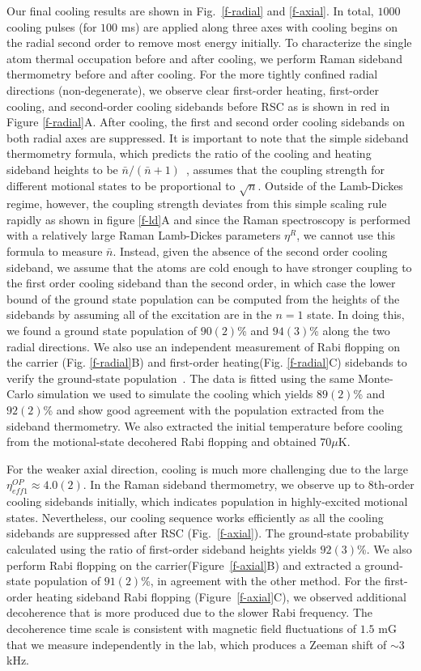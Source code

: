\documentclass[aps,prl,twocolumn,groupedaddress]{revtex4-1}
\begin{document}
Our final cooling results are shown in Fig.~\ref{f-radial} and \ref{f-axial}.
In total, $1000$ cooling pulses (for $100$ ms) are applied along three axes with
cooling begins on the radial second order to remove most energy initially.
To characterize the single atom thermal occupation before and after cooling,
we perform Raman sideband thermometry before and after cooling.
For the more tightly confined radial directions (non-degenerate),
we observe clear first-order heating, first-order cooling,
and second-order cooling sidebands before RSC as is shown in red in Figure \ref{f-radial}A.
After cooling, the first and second order cooling sidebands on both radial axes are suppressed.
It is important to note that the simple sideband thermometry formula,
which predicts the ratio of the cooling and heating sideband heights
to be $\bar n / (\bar n + 1)$~\cite{Monroe1995},
assumes that the coupling strength for different motional states to be proportional to $\sqrt{n}$.
Outside of the Lamb-Dickes regime, however,
the coupling strength deviates from this simple scaling rule rapidly
as shown in figure \ref{f-ld}A and since the Raman spectroscopy is performed
with a relatively large Raman Lamb-Dickes parameters $\eta^R$, we cannot use this formula to
measure $\bar n$.
Instead, given the absence of the second order cooling sideband,
we assume that the atoms are cold enough to have stronger coupling to the first order cooling
sideband than the second order, in which case the lower bound of the ground state population
can be computed from the heights of the sidebands by assuming all of the excitation are in the
$n=1$ state. In doing this, we found a ground state population of $90(2)$\%
and $94(3)$\% along the two radial directions.
We also use an independent measurement of Rabi flopping on the carrier (Fig. \ref{f-radial}B)
and first-order heating(Fig. \ref{f-radial}C) sidebands
to verify the ground-state population~\cite{Meekhof1996}.
The data is fitted using the same Monte-Carlo simulation we used to simulate the cooling
which yields $89(2)$\% and $92(2)$\% and show good agreement with
the population extracted from the sideband thermometry.
We also extracted the initial temperature before cooling
from the motional-state decohered Rabi flopping and obtained $70 \mu$K.

For the weaker axial direction, cooling is much more challenging
due to the large $\eta^{OP}_{eff1}\approx 4.0(2)$.
In the Raman sideband thermometry, we observe up to 8th-order cooling sidebands initially,
which indicates population in highly-excited motional states.
Nevertheless, our cooling sequence works efficiently as all the cooling sidebands are suppressed
after RSC (Fig.~\ref{f-axial}).
The ground-state probability calculated using the ratio of first-order sideband heights yields
$92(3)$\%. We also perform Rabi flopping on the carrier(Figure~\ref{f-axial}B)
and extracted a ground-state population of $91(2)$\%, in agreement with the other method.
For the first-order heating sideband Rabi flopping (Figure~\ref{f-axial}C),
we observed additional decoherence that is more produced due to the slower Rabi frequency.
The decoherence time scale is consistent with magnetic field fluctuations of $1.5$ mG
that we measure independently in the lab, which produces a Zeeman shift of $\sim 3$ kHz.
\end{document}
